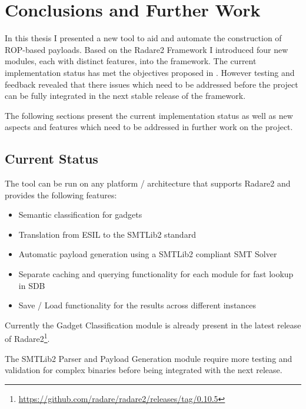 \chapter{Conclusions and Further Work}
\label{chapter:conclusion}

In this thesis I presented a new tool to aid and automate the construction of ROP-based payloads. Based on the Radare2 Framework I introduced four new modules, each with distinct features, into the framework. The current implementation status has met the objectives proposed in . However testing and feedback revealed that there issues which need to be addressed before the project can be fully integrated in the next stable release of the framework.

The following sections present the current implementation status as well as new aspects and features which need to be addressed in further work on the project.

\section{Current Status}

The tool can be run on any platform / architecture that supports Radare2 and provides the following features:

\begin{itemize}
	\item Semantic classification for gadgets
	\item Translation from ESIL to the SMTLib2 standard
	\item Automatic payload generation using a SMTLib2 compliant SMT Solver
	\item Separate caching and querying functionality for each module for fast lookup in SDB
	\item Save / Load functionality for the results across different instances
\end{itemize}

Currently the Gadget Classification module is already present in the latest release of Radare2\footnote{\url{https://github.com/radare/radare2/releases/tag/0.10.5}}.

The SMTLib2 Parser and Payload Generation module require more testing and validation for complex binaries before being integrated with the next release.


